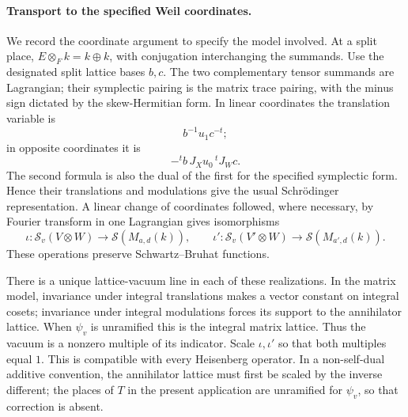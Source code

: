 \paragraph{Transport to the specified Weil coordinates.}
We record the coordinate argument to specify the model involved.
At a split place,
\(E\otimes_F k=k\oplus k\), with conjugation interchanging the
summands.  Use the designated split lattice bases \(b,c\).
The two complementary tensor summands are Lagrangian; their
symplectic pairing is the matrix trace pairing, with the minus
sign dictated by the skew-Hermitian form.  In linear coordinates
the translation variable is
\[
 b^{-1}u_1c^{-t};
\]
in opposite coordinates it is
\[
                 -{}^tb\,J_Xu_0\,{}^tJ_Wc .
\]
The second formula is also the dual of the first for the
specified symplectic form.  Hence their translations and
modulations give the usual Schr\"odinger representation.
A linear change of coordinates followed, where necessary, by
Fourier transform in one Lagrangian gives isomorphisms
\[
 \iota:\mathcal S_v(V\otimes W)\longrightarrow
                         \mathcal S(M_{a,d}(k)),\qquad
 \iota':\mathcal S_v(V'\otimes W)\longrightarrow
                         \mathcal S(M_{a',d}(k)).
\]
These operations preserve Schwartz--Bruhat functions.

There is a unique lattice-vacuum line in each of these
realizations.  In the matrix model, invariance under integral
translations makes a vector constant on integral cosets;
invariance under integral modulations forces its support to
the annihilator lattice.  When \(\psi_v\) is unramified this is
the integral matrix lattice.  Thus the vacuum is a nonzero
multiple of its indicator.  Scale \(\iota,\iota'\) so that
both multiples equal \(1\).  This is compatible with every
Heisenberg operator.  In a non-self-dual additive convention,
the annihilator lattice must first be scaled by the inverse
different; the places of \(T\) in the present application are
unramified for \(\psi_v\), so that correction is absent.


